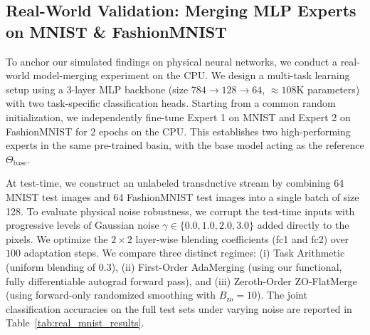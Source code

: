 \subsection{Real-World Validation: Merging MLP Experts on MNIST \& FashionMNIST} \label{sec:experiments_mlp}
To anchor our simulated findings on physical neural networks, we conduct a real-world model-merging experiment on the CPU.
We design a multi-task learning setup using a 3-layer MLP backbone (size $784 \to 128 \to 64$, $\approx 108$K parameters) with two task-specific classification heads.
Starting from a common random initialization, we independently fine-tune Expert 1 on MNIST and Expert 2 on FashionMNIST for 2 epochs on the CPU.
This establishes two high-performing experts in the same pre-trained basin, with the base model acting as the reference $\Theta_{\text{base}}$.

At test-time, we construct an unlabeled transductive stream by combining 64 MNIST test images and 64 FashionMNIST test images into a single batch of size 128.
To evaluate physical noise robustness, we corrupt the test-time inputs with progressive levels of Gaussian noise $\gamma \in \{0.0, 1.0, 2.0, 3.0\}$ added directly to the pixels.
We optimize the $2 \times 2$ layer-wise blending coefficients (fc1 and fc2) over $100$ adaptation steps.
We compare three distinct regimes: (i) Task Arithmetic (uniform blending of $0.3$), (ii) First-Order AdaMerging (using our functional, fully differentiable autograd forward pass), and (iii) Zeroth-Order ZO-FlatMerge (using forward-only randomized smoothing with $B_{\text{zo}} = 10$).
The joint classification accuracies on the full test sets under varying noise are reported in Table~\ref{tab:real_mnist_results}.


